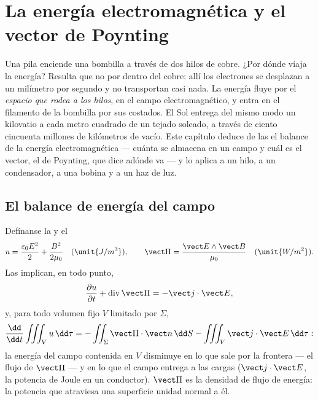 \chapter{La energía electromagnética y el vector de Poynting}\label{ch:b2:poynting-vector}

Una pila enciende una bombilla a través de dos hilos de cobre. ¿Por dónde
viaja la energía? Resulta que no por dentro del cobre: allí los electrones
se desplazan a un milímetro por segundo y no transportan casi nada. La
energía fluye por el \emph{espacio que rodea a los hilos}, en el campo
electromagnético, y entra en el filamento de la bombilla por sus costados.
El Sol entrega del mismo modo un kilovatio a cada metro cuadrado de un
tejado soleado, a través de ciento cincuenta millones de kilómetros de
vacío. Este capítulo deduce de las  el balance de la
energía electromagnética --- cuánta se almacena en un campo y cuál es el
vector, el de Poynting, que dice adónde va --- y lo aplica a un hilo, a un
condensador, a una bobina y a un haz de luz.

\section{El balance de energía del campo}

\begin{theorem}\label{thm:b2:poynting-vector:poynting}
Defínanse la \emph{} y el \emph{}
\[
u = \frac{\varepsilon_0E^2}2 + \frac{B^2}{2\mu_0} \quad (\unit{J/m^3}) , \qquad
\vect\Pi = \frac{\vect E\wedge\vect B}{\mu_0} \quad (\unit{W/m^2}) .
\]
Las  implican, en todo punto,
\[
\frac{\partial u}{\partial t} + \operatorname{div}\vect\Pi = -\vect j\cdot\vect E ,
\]
y, para todo volumen fijo $V$ limitado por $\Sigma$,
\[
\frac{\dd}{\dd t}\iiint_Vu\,\dd\tau = -\iint_\Sigma\vect\Pi\cdot\vect n\,\dd S - \iiint_V\vect j\cdot\vect E\,\dd\tau :
\]
la energía del campo contenida en $V$ disminuye en lo que sale por la
frontera --- el flujo de $\vect\Pi$ --- y en lo que el campo entrega a las
cargas ($\vect j\cdot\vect E$, la potencia de Joule en un conductor).
$\vect\Pi$ es la densidad de flujo de energía: la potencia que atraviesa
una superficie unidad normal a él.
\end{theorem}

